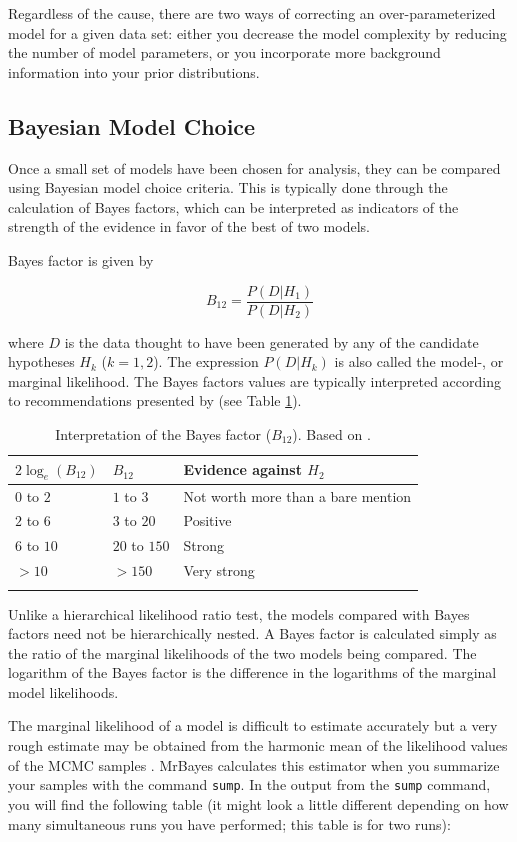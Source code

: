 \documentclass[12pt]{book}
\newcommand{\ttt}[1]{\texttt{#1}}
\begin{document}
Regardless of the cause, there are two ways of correcting an over-parameterized model for a given
data set: either you decrease the model complexity by reducing the number of model parameters, or
you incorporate more background information into your prior distributions.

\subsection{Bayesian Model Choice}
\label{bayesianModelChoice}

Once a small set of models have been chosen for analysis, they can be compared using Bayesian model
choice criteria. This is typically done through the calculation of Bayes factors, which can be
interpreted as indicators of the strength of the evidence in favor of the best of two models.

Bayes factor is given by

$$
B_{12} = \frac{P(D|H_{1})}{P(D|H_{2})}
$$

where $D$ is the data thought to have been generated by any of the candidate hypotheses
$H_{k}$ ($k = 1,2$). The expression $P(D|H_{k})$ is also called the model-, or marginal
likelihood. The Bayes factors values are typically interpreted according to recommendations
presented by \citet{kass95} (see Table \ref{table:bftable}).

\begin{longtable}[h!]{@{}lll@{}}
\toprule
\(2\log_{e}(B_{12})\) & \(B_{12}\) & Evidence against
\(H_{2}\)\tabularnewline
\midrule
\endhead
\(0\) to \(2\) & \(1\) to \(3\) & Not worth more than a bare
mention\tabularnewline
\(2\) to \(6\) & \(3\) to \(20\) & Positive\tabularnewline
\(6\) to \(10\) & \(20\) to \(150\) & Strong\tabularnewline
\(>10\) & \(>150\) & Very strong\tabularnewline
\bottomrule
\caption{Interpretation of the Bayes factor ($B_{12}$). Based on \citep{kass95}.}
\label{table:bftable}
\end{longtable}

Unlike a hierarchical likelihood ratio test, the models compared with Bayes factors need not be
hierarchically nested. A Bayes factor is calculated simply as the ratio of the marginal likelihoods
of the two models being compared. The logarithm of the Bayes factor is the difference in the
logarithms of the marginal model likelihoods.

The marginal likelihood of a model is difficult to estimate accurately but a very rough estimate
may be obtained from the harmonic mean of the likelihood values of the MCMC samples
\citep{newton94}. MrBayes calculates this estimator when you summarize your samples with the
command \ttt{sump}. In the output from the \ttt{sump} command, you will find the following table
(it might look a little different depending on how many simultaneous runs you have performed; this
table is for two runs):
\end{document}
